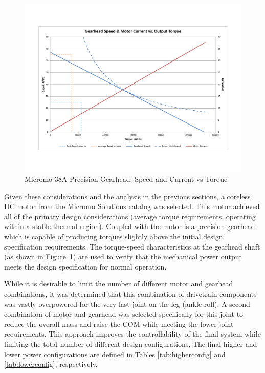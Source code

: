 \begin{figure}[!h]
	\begin{center}
    \includegraphics[trim = 20mm 30mm 20mm 30mm,clip,width=15cm]{fig/design/gearhead1.pdf}
	\end{center}
  \caption{Micromo 38A Precision Gearhead: Speed and Current vs Torque}
  \label{fig:micromo38a}
\end{figure}

Given these considerations and the analysis in the previous sections, a coreless DC motor from the Micromo Solutions catalog was selected. This motor achieved all of the primary design considerations (average torque requirements, operating within a stable thermal region). Coupled with the motor is a precision gearhead which is capable of producing torques slightly above the initial design specification requirements. The torque-speed characteristics at the gearhead shaft (as shown in Figure~\ref{fig:micromo38a}) are used to verify that the mechanical power output meets the design specification for normal operation. 

While it is desirable to limit the number of different motor and gearhead combinations, it was determined that this combination of drivetrain components was vastly overpowered for the very last joint on the leg (ankle roll). A second combination of motor and gearhead was selected specifically for this joint to reduce the overall mass and raise the COM while meeting the lower joint requirements. This approach improves the controllability of the final system while limiting the total number of different design configurations. The final higher and lower power configurations are defined in Tables \ref{tab:higherconfig} and \ref{tab:lowerconfig}, respectively. 

